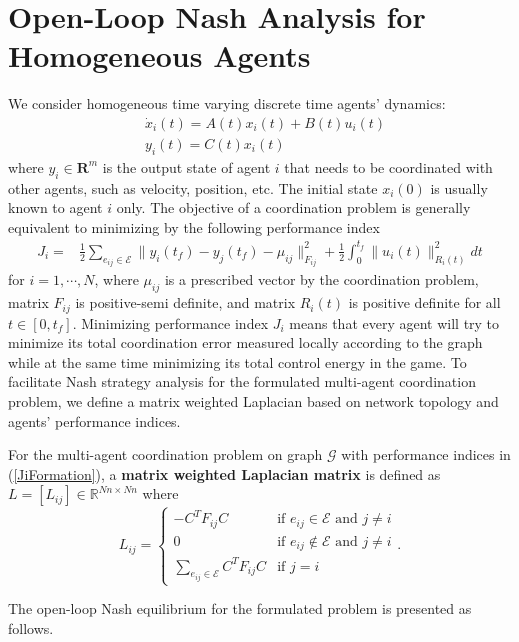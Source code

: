 \documentclass[12pt,draftcls,onecolumn]{IEEEtran}  %
\begin{document}
\section{Open-Loop Nash Analysis for Homogeneous Agents}
We consider homogeneous time varying discrete time agents' dynamics:
\begin{align*}
&\dot{x}_i(t)=A(t)x_i(t)+B(t)u_i(t)\\
&y_{i}(t)=C(t)x_i(t)
\end{align*}
where $y_i\in\mathbf{R}^m$ is the output state of agent $i$ that needs to be coordinated with other agents, such as velocity, position, etc. The initial state $x_i(0)$ is usually known to agent $i$ only. The objective of a coordination problem is generally equivalent to minimizing by the following performance index
\begin{align}
J_i=&\frac{1}{2}\sum_{e_{ij}\in\mathcal{E}} \|y_i(t_f)-y_j(t_f)-\mu_{ij}\|^2_{F_{ij}} +\frac{1}{2}\int_{0}^{t_f} \|u_i(t)\|^2_{R_i(t)}dt \label{JiFormation}
\end{align}
for $i=1,\cdots,N$, where $\mu_{ij}$ is a prescribed vector by the coordination problem, matrix $F_{ij}$ is positive-semi definite, and matrix $R_i(t)$ is positive definite for all $t\in[0,t_f]$. Minimizing performance index $J_i$ means that every agent will try to minimize its total coordination error measured locally according to the graph while at the same time minimizing its total control energy in the game. To facilitate Nash strategy analysis for the formulated multi-agent coordination problem, we define a matrix weighted Laplacian based on network topology and agents' performance indices.
\begin{Def}
For the multi-agent coordination problem on graph $\mathcal{G}$ with performance indices in (\ref{JiFormation}), a \textbf{matrix weighted Laplacian matrix} is defined as $L=[L_{ij}]\in\mathbb{R}^{Nn\times Nn}$ where
\begin{equation}
L_{ij}=\left\{\begin{array}{ll}
-C^TF_{ij}C&\mbox{if $e_{ij}\in\mathcal{E}$ and $j\neq i$}\\
0&\mbox{if $e_{ij}\notin\mathcal{E}$ and $j\neq i$}\\
\displaystyle \sum_{e_{ij}\in\mathcal{E}}C^TF_{ij}C&\mbox{if $j=i$}
\end{array}\right..\label{laplacian}
\end{equation}
\end{Def}
The open-loop Nash equilibrium for the formulated problem is presented as follows.
\end{document}
